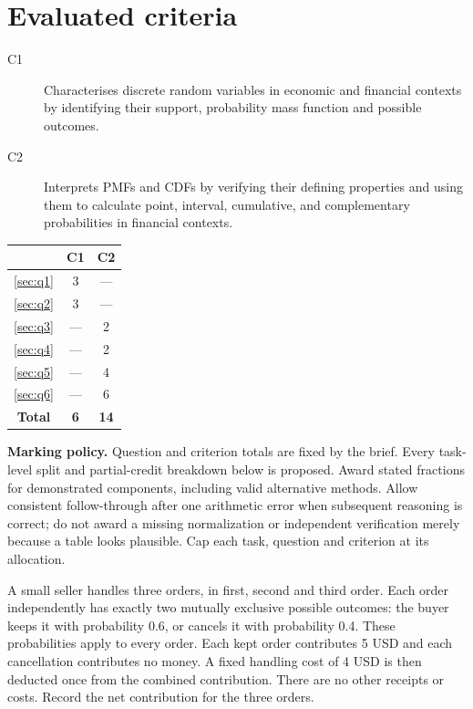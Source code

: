 \section*{Evaluated criteria}
\begin{description}
\item[C1] Characterises discrete random variables in economic and financial contexts by identifying their support, probability mass function and possible outcomes.
\item[C2] Interprets PMFs and CDFs by verifying their defining properties and using them to calculate point, interval, cumulative, and complementary probabilities in financial contexts.
\end{description}


\begin{center}
\begin{tabular}{|c|c|c|}
	\hline\textbf{\textnumero} & \textbf{C1} & \textbf{C2} \\ \hline
	\ref*{sec:q1} & 3 & --- \\\hline
	\ref*{sec:q2} & 3 & --- \\\hline
	\ref*{sec:q3} & --- & 2 \\\hline
	\ref*{sec:q4} & --- & 2 \\\hline
	\ref*{sec:q5} & --- & 4 \\\hline
	\ref*{sec:q6} & --- & 6 \\\hline
	\textbf{Total} & \textbf{6} & \textbf{14} \\\hline
\end{tabular}
\end{center}


\textbf{Marking policy.} Question and criterion totals are fixed by the brief. Every task-level split and partial-credit breakdown below is proposed. Award stated fractions for demonstrated components, including valid alternative methods. Allow consistent follow-through after one arithmetic error when subsequent reasoning is correct; do not award a missing normalization or independent verification merely because a table looks plausible. Cap each task, question and criterion at its allocation.

\clearpage
{}

A small seller handles three orders, in first, second and third order. Each order independently has exactly two mutually exclusive possible outcomes: the buyer keeps it with probability 0.6, or cancels it with probability 0.4. These probabilities apply to every order. Each kept order contributes 5 USD and each cancellation contributes no money. A fixed handling cost of 4 USD is then deducted once from the combined contribution. There are no other receipts or costs. Record the net contribution for the three orders.

